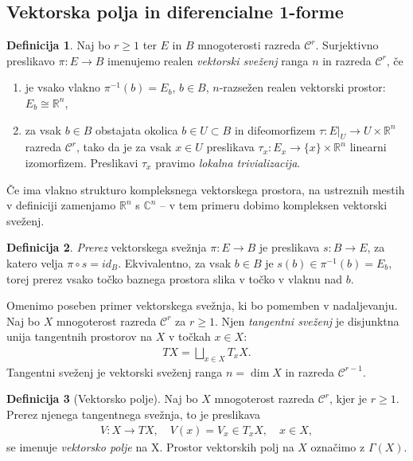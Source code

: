\documentclass[12pt,a4paper,twoside]{article}
\theoremstyle{definition} %
\newtheorem{definicija}{Definicija}[section]
\theoremstyle{plain} %
\numberwithin{equation}{section}  %
\newcommand{\R}{\mathbb R}
\newcommand{\C}{\mathbb C}
\begin{document}
\subsection{Vektorska polja in diferencialne 1-forme}
%
\begin{definicija}
Naj bo $r \geq 1$ ter $E$ in $B$ mnogoterosti razreda $\mathcal{C}^{r}$.
Surjektivno preslikavo $\pi \colon E \to B$ imenujemo realen \emph{vektorski sveženj} ranga $n$ in razreda $\mathcal{C}^{r}$, če
\begin{enumerate}
\item je vsako vlakno $\pi^{-1}(b) = E_{b}$, $b \in B$, $n$-razsežen realen vektorski prostor: $E_{b} \cong \R^{n}$,
\item za vsak $b \in B$ obstajata okolica $b \in U \subset B$ in difeomorfizem $\tau \colon E|_{U} \to U \times \R^{n}$ razreda $\mathcal{C}^{r}$, tako da je za vsak $x \in U$ preslikava $ \tau_{x} \colon E_{x} \to \{x\} \times \R^{n} $ linearni izomorfizem. Preslikavi $\tau_{x}$ pravimo \emph{lokalna trivializacija}.
\end{enumerate}
Če ima vlakno strukturo kompleksnega vektorskega prostora, na ustreznih mestih v definiciji zamenjamo $\R^{n}$ s $\C^{n}$ -- v tem primeru dobimo kompleksen vektorski sveženj.
\end{definicija}

\begin{definicija}
\emph{Prerez} vektorskega svežnja $\pi \colon E \to B$ je preslikava $s \colon B \to E$, za katero velja $\pi \circ s = id_{B}$.
Ekvivalentno, za vsak $b \in B$ je $s(b) \in \pi^{-1}(b) = E_{b}$, torej prerez vsako točko baznega prostora slika v točko v vlaknu nad $b$.
\end{definicija}

Omenimo poseben primer vektorskega svežnja, ki bo pomemben v nadaljevanju. Naj bo $X$ mnogoterost razreda $\mathcal{C}^{r}$ za $r \geq 1$. Njen \emph{tangentni sveženj} je disjunktna unija tangentnih prostorov na $X$ v točkah $x \in X$:
\begin{gather}
TX = \bigsqcup_{x \in X} T_{x}X.
\end{gather}
Tangentni sveženj je vektorski sveženj ranga $n = \dim X$ in razreda $\mathcal{C}^{r-1}$.

\begin{definicija} [Vektorsko polje]
Naj bo $X$ mnogoterost razreda $\mathcal{C}^{r}$, kjer je $r \geq 1$. Prerez njenega tangentnega svežnja, to je preslikava 
\begin{gather}
V \colon X \to TX, \quad V(x) = V_{x} \in T_{x}X, \quad x \in X,
\end{gather}
se imenuje \emph{vektorsko polje} na X. Prostor vektorskih polj na $X$ označimo z $\Gamma (X)$.
\end{definicija}
\end{document}
